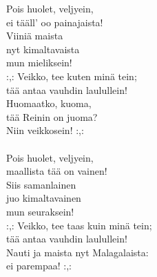 
            Pois huolet, veljyein, \\
            ei tääll' oo painajaista! \\
            Viiniä maista \\
            nyt kimaltavaista \\
            mun mieliksein! \\
            :,: Veikko, tee kuten minä tein; \\
            tää antaa vauhdin laulullein! \\
            Huomaatko, kuoma, \\
            tää Reinin on juoma? \\
            Niin veikkosein! :,: \\
\hspace{10mm} \\
            Pois huolet, veljyein, \\
            maallista tää on vainen! \\
            Siis samanlainen \\
            juo kimaltavainen \\
            mun seuraksein! \\
            :,: Veikko, tee taas kuin minä tein; \\
            tää antaa vauhdin laulullein! \\
            Nauti ja maista nyt Malagalaista: \\
            ei parempaa! :,: \\
